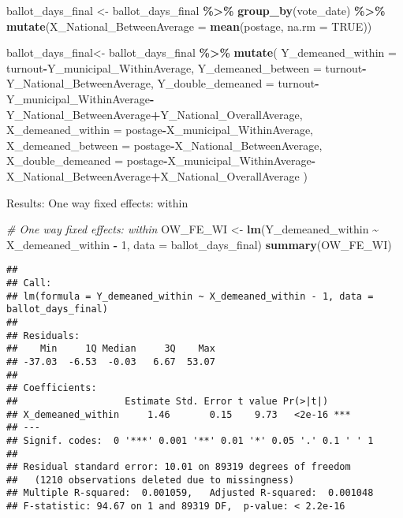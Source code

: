 \documentclass[
]{book}
\newenvironment{Shaded}{\begin{snugshade}}{\end{snugshade}}
\newcommand{\AttributeTok}[1]{\textcolor[rgb]{0.13,0.29,0.53}{#1}}
\newcommand{\CommentTok}[1]{\textcolor[rgb]{0.56,0.35,0.01}{\textit{#1}}}
\newcommand{\ConstantTok}[1]{\textcolor[rgb]{0.56,0.35,0.01}{#1}}
\newcommand{\DecValTok}[1]{\textcolor[rgb]{0.00,0.00,0.81}{#1}}
\newcommand{\FunctionTok}[1]{\textcolor[rgb]{0.13,0.29,0.53}{\textbf{#1}}}
\newcommand{\NormalTok}[1]{#1}
\newcommand{\OtherTok}[1]{\textcolor[rgb]{0.56,0.35,0.01}{#1}}
\newcommand{\SpecialCharTok}[1]{\textcolor[rgb]{0.81,0.36,0.00}{\textbf{#1}}}
\begin{document}
\begin{Shaded}
\begin{Highlighting}[]
\NormalTok{ballot\_days\_final }\OtherTok{\textless{}{-}}\NormalTok{ ballot\_days\_final }\SpecialCharTok{\%\textgreater{}\%}
  \FunctionTok{group\_by}\NormalTok{(vote\_date) }\SpecialCharTok{\%\textgreater{}\%}
  \FunctionTok{mutate}\NormalTok{(}\AttributeTok{X\_National\_BetweenAverage =} \FunctionTok{mean}\NormalTok{(postage, }\AttributeTok{na.rm =} \ConstantTok{TRUE}\NormalTok{))}
         

\NormalTok{ballot\_days\_final}\OtherTok{\textless{}{-}}\NormalTok{ ballot\_days\_final }\SpecialCharTok{\%\textgreater{}\%}
  \FunctionTok{mutate}\NormalTok{( }\AttributeTok{Y\_demeaned\_within =}\NormalTok{ turnout}\SpecialCharTok{{-}}\NormalTok{Y\_municipal\_WithinAverage,}
          \AttributeTok{Y\_demeaned\_between =}\NormalTok{ turnout}\SpecialCharTok{{-}}\NormalTok{Y\_National\_BetweenAverage,}
          \AttributeTok{Y\_double\_demeaned =}\NormalTok{ turnout}\SpecialCharTok{{-}}\NormalTok{Y\_municipal\_WithinAverage}\SpecialCharTok{{-}}\NormalTok{Y\_National\_BetweenAverage}\SpecialCharTok{+}\NormalTok{Y\_National\_OverallAverage,}
          \AttributeTok{X\_demeaned\_within =}\NormalTok{ postage}\SpecialCharTok{{-}}\NormalTok{X\_municipal\_WithinAverage,}
          \AttributeTok{X\_demeaned\_between =}\NormalTok{ postage}\SpecialCharTok{{-}}\NormalTok{X\_National\_BetweenAverage,}
          \AttributeTok{X\_double\_demeaned =}\NormalTok{ postage}\SpecialCharTok{{-}}\NormalTok{X\_municipal\_WithinAverage}\SpecialCharTok{{-}}\NormalTok{X\_National\_BetweenAverage}\SpecialCharTok{+}\NormalTok{X\_National\_OverallAverage}
\NormalTok{        )}
\end{Highlighting}
\end{Shaded}

Results: One way fixed effects: within

\begin{Shaded}
\begin{Highlighting}[]
\CommentTok{\# One way fixed effects: within}
\NormalTok{OW\_FE\_WI }\OtherTok{\textless{}{-}} \FunctionTok{lm}\NormalTok{(Y\_demeaned\_within }\SpecialCharTok{\textasciitilde{}}\NormalTok{ X\_demeaned\_within }\SpecialCharTok{{-}} \DecValTok{1}\NormalTok{, }\AttributeTok{data =}\NormalTok{ ballot\_days\_final)}
\FunctionTok{summary}\NormalTok{(OW\_FE\_WI)}
\end{Highlighting}
\end{Shaded}

\begin{verbatim}
## 
## Call:
## lm(formula = Y_demeaned_within ~ X_demeaned_within - 1, data = ballot_days_final)
## 
## Residuals:
##    Min     1Q Median     3Q    Max 
## -37.03  -6.53  -0.03   6.67  53.07 
## 
## Coefficients:
##                   Estimate Std. Error t value Pr(>|t|)    
## X_demeaned_within     1.46       0.15    9.73   <2e-16 ***
## ---
## Signif. codes:  0 '***' 0.001 '**' 0.01 '*' 0.05 '.' 0.1 ' ' 1
## 
## Residual standard error: 10.01 on 89319 degrees of freedom
##   (1210 observations deleted due to missingness)
## Multiple R-squared:  0.001059,   Adjusted R-squared:  0.001048 
## F-statistic: 94.67 on 1 and 89319 DF,  p-value: < 2.2e-16
\end{verbatim}
\end{document}
